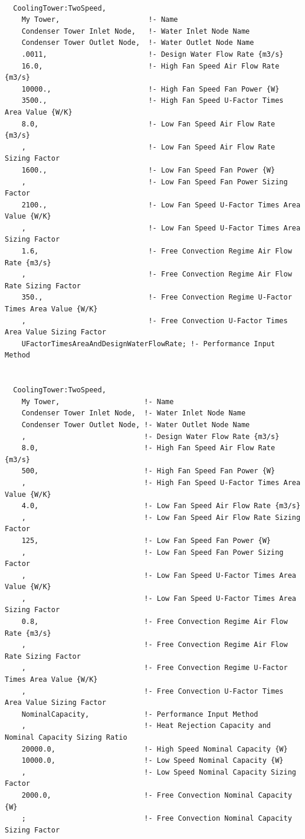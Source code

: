 \begin{lstlisting}

  CoolingTower:TwoSpeed,
    My Tower,                     !- Name
    Condenser Tower Inlet Node,   !- Water Inlet Node Name
    Condenser Tower Outlet Node,  !- Water Outlet Node Name
    .0011,                        !- Design Water Flow Rate {m3/s}
    16.0,                         !- High Fan Speed Air Flow Rate {m3/s}
    10000.,                       !- High Fan Speed Fan Power {W}
    3500.,                        !- High Fan Speed U-Factor Times Area Value {W/K}
    8.0,                          !- Low Fan Speed Air Flow Rate {m3/s}
    ,                             !- Low Fan Speed Air Flow Rate Sizing Factor
    1600.,                        !- Low Fan Speed Fan Power {W}
    ,                             !- Low Fan Speed Fan Power Sizing Factor
    2100.,                        !- Low Fan Speed U-Factor Times Area Value {W/K}
    ,                             !- Low Fan Speed U-Factor Times Area Sizing Factor
    1.6,                          !- Free Convection Regime Air Flow Rate {m3/s}
    ,                             !- Free Convection Regime Air Flow Rate Sizing Factor
    350.,                         !- Free Convection Regime U-Factor Times Area Value {W/K}
    ,                             !- Free Convection U-Factor Times Area Value Sizing Factor
    UFactorTimesAreaAndDesignWaterFlowRate; !- Performance Input Method


  CoolingTower:TwoSpeed,
    My Tower,                    !- Name
    Condenser Tower Inlet Node,  !- Water Inlet Node Name
    Condenser Tower Outlet Node, !- Water Outlet Node Name
    ,                            !- Design Water Flow Rate {m3/s}
    8.0,                         !- High Fan Speed Air Flow Rate {m3/s}
    500,                         !- High Fan Speed Fan Power {W}
    ,                            !- High Fan Speed U-Factor Times Area Value {W/K}
    4.0,                         !- Low Fan Speed Air Flow Rate {m3/s}
    ,                            !- Low Fan Speed Air Flow Rate Sizing Factor
    125,                         !- Low Fan Speed Fan Power {W}
    ,                            !- Low Fan Speed Fan Power Sizing Factor
    ,                            !- Low Fan Speed U-Factor Times Area Value {W/K}
    ,                            !- Low Fan Speed U-Factor Times Area Sizing Factor
    0.8,                         !- Free Convection Regime Air Flow Rate {m3/s}
    ,                            !- Free Convection Regime Air Flow Rate Sizing Factor
    ,                            !- Free Convection Regime U-Factor Times Area Value {W/K}
    ,                            !- Free Convection U-Factor Times Area Value Sizing Factor
    NominalCapacity,             !- Performance Input Method
    ,                            !- Heat Rejection Capacity and Nominal Capacity Sizing Ratio
    20000.0,                     !- High Speed Nominal Capacity {W}
    10000.0,                     !- Low Speed Nominal Capacity {W}
    ,                            !- Low Speed Nominal Capacity Sizing Factor
    2000.0,                      !- Free Convection Nominal Capacity {W}
    ;                            !- Free Convection Nominal Capacity Sizing Factor



\end{lstlisting}
